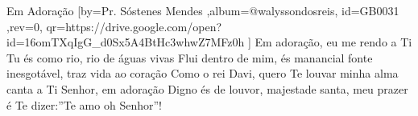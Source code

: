\beginsong
{Em Adoração %
}[by={Pr. Sóstenes Mendes %
},album={@walyssondosreis},
id={GB0031 %
},rev={0}, %
qr={https://drive.google.com/open?id=16omTXqIgG_d0Sx5A4BtHc3whwZ7MFz0h %
}]
\beginverse*
Em adoração, eu me rendo a Ti
Tu és como rio, rio de águas vivas
Flui dentro de mim, és manancial
fonte inesgotável, traz vida ao coração
\endverse
\beginchorus
Como o rei Davi, quero Te louvar
minha alma canta a Ti Senhor, em adoração
Digno és de louvor, majestade santa,
meu prazer é Te dizer:''Te amo oh Senhor''!
\endchorus
\vspace{4em} %
\begin{comment}
\lstset{basicstyle=\scriptsize\bf} %
\tab{Solo 1}
\begin{lstlisting}
E|-----------------------------------------------------|
B|-----------------------------------------------------|
G|-----------------------------------------------------|
D|-----------------------------------------------------|
A|-----------------------------------------------------|
E|-----------------------------------------------------|
\end{lstlisting}
\end{comment}
 
